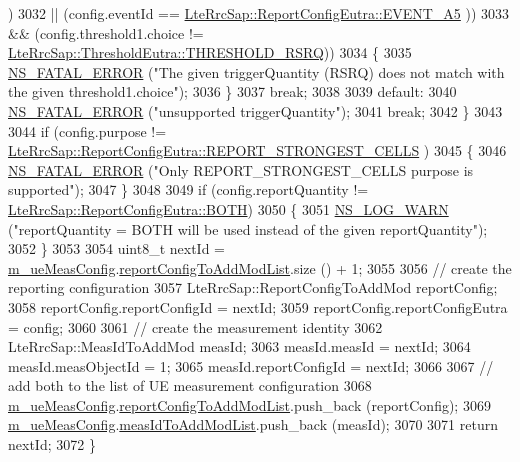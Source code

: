 \begin{DoxyCode}
      )
3032            || (config.eventId == \hyperlink{structns3_1_1LteRrcSap_1_1ReportConfigEutra_ab8152dc095987f60bee2e9115046902fae92d8c286b3b1a6e39edc844df72588c}{LteRrcSap::ReportConfigEutra::EVENT\_A5}
      ))
3033           && (config.threshold1.choice != 
      \hyperlink{structns3_1_1LteRrcSap_1_1ThresholdEutra_ad3ed2704b836132980dd2e97cb03822ca6e8bda2b99825f09f53388c29b6402b4}{LteRrcSap::ThresholdEutra::THRESHOLD\_RSRQ}))
3034         \{
3035           \hyperlink{group__fatal_ga5131d5e3f75d7d4cbfd706ac456fdc85}{NS\_FATAL\_ERROR} (\textcolor{stringliteral}{"The given triggerQuantity (RSRQ) does not match with the given
       threshold1.choice"});
3036         \}
3037       \textcolor{keywordflow}{break};
3038 
3039     \textcolor{keywordflow}{default}:
3040       \hyperlink{group__fatal_ga5131d5e3f75d7d4cbfd706ac456fdc85}{NS\_FATAL\_ERROR} (\textcolor{stringliteral}{"unsupported triggerQuantity"});
3041       \textcolor{keywordflow}{break};
3042     \}
3043 
3044   \textcolor{keywordflow}{if} (config.purpose != \hyperlink{structns3_1_1LteRrcSap_1_1ReportConfigEutra_a2587c7b064e40788add4c94395026700a448602bbc7d0d7ba4d5c27833c2ca041}{LteRrcSap::ReportConfigEutra::REPORT\_STRONGEST\_CELLS}
      )
3045     \{
3046       \hyperlink{group__fatal_ga5131d5e3f75d7d4cbfd706ac456fdc85}{NS\_FATAL\_ERROR} (\textcolor{stringliteral}{"Only REPORT\_STRONGEST\_CELLS purpose is supported"});
3047     \}
3048 
3049   \textcolor{keywordflow}{if} (config.reportQuantity != \hyperlink{structns3_1_1LteRrcSap_1_1ReportConfigEutra_a6d641a71ebc481d2eb99359e72e9ea40a71890e01bc4f9caba54f12180edbaa90}{LteRrcSap::ReportConfigEutra::BOTH})
3050     \{
3051       \hyperlink{group__logging_gade7208b4009cdf0e25783cd26766f559}{NS\_LOG\_WARN} (\textcolor{stringliteral}{"reportQuantity = BOTH will be used instead of the given reportQuantity"});
3052     \}
3053 
3054   uint8\_t nextId = \hyperlink{classns3_1_1LteEnbRrc_a98d0766aa6a671bb20f2996c634e6b17}{m\_ueMeasConfig}.\hyperlink{structns3_1_1LteRrcSap_1_1MeasConfig_ac108843a06536367bc3ca19dbd1421da}{reportConfigToAddModList}.size () + 
      1;
3055 
3056   \textcolor{comment}{// create the reporting configuration}
3057   LteRrcSap::ReportConfigToAddMod reportConfig;
3058   reportConfig.reportConfigId = nextId;
3059   reportConfig.reportConfigEutra = config;
3060 
3061   \textcolor{comment}{// create the measurement identity}
3062   LteRrcSap::MeasIdToAddMod measId;
3063   measId.measId = nextId;
3064   measId.measObjectId = 1;
3065   measId.reportConfigId = nextId;
3066 
3067   \textcolor{comment}{// add both to the list of UE measurement configuration}
3068   \hyperlink{classns3_1_1LteEnbRrc_a98d0766aa6a671bb20f2996c634e6b17}{m\_ueMeasConfig}.\hyperlink{structns3_1_1LteRrcSap_1_1MeasConfig_ac108843a06536367bc3ca19dbd1421da}{reportConfigToAddModList}.push\_back (reportConfig);
3069   \hyperlink{classns3_1_1LteEnbRrc_a98d0766aa6a671bb20f2996c634e6b17}{m\_ueMeasConfig}.\hyperlink{structns3_1_1LteRrcSap_1_1MeasConfig_ade3c8b430270fdbc2d1fdd0de3d71b3f}{measIdToAddModList}.push\_back (measId);
3070 
3071   \textcolor{keywordflow}{return} nextId;
3072 \}
\end{DoxyCode}


